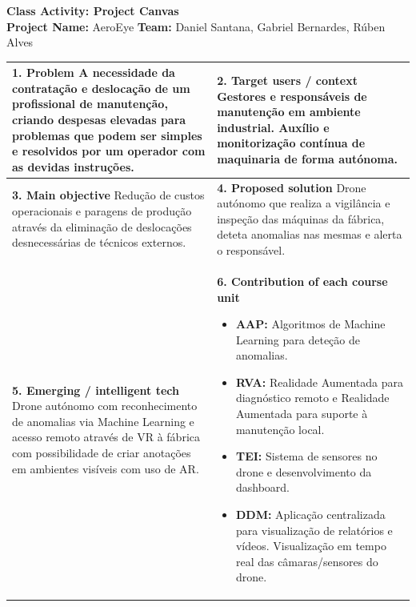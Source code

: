 \documentclass[11pt, a4paper]{article}
\begin{document}
\thispagestyle{empty} 

\begin{center}
    \textcolor{brandblue}{\LARGE \textbf{Class Activity: Project Canvas}} \\[0.15cm]
    \normalsize 
    \textbf{Project Name:} AeroEye \hspace{1cm} 
    \textbf{Team:} Daniel Santana, Gabriel Bernardes, Rúben Alves
\end{center}
\vspace{0.2cm}

\renewcommand{\arraystretch}{1.2}
\setlength{\tabcolsep}{15pt}

\noindent
\begin{tabularx}{\textwidth}{>{\raggedright\arraybackslash}X | >{\raggedright\arraybackslash}X}
\toprule
\textcolor{brandblue}{\textbf{1. Problem}} \newline
A necessidade da contratação e deslocação de um profissional de manutenção, criando despesas elevadas para problemas que podem ser simples e resolvidos por um operador com as devidas instruções.
& 
\textcolor{brandblue}{\textbf{2. Target users / context}} \newline
Gestores e responsáveis de manutenção em ambiente industrial. Auxílio e monitorização contínua de maquinaria de forma autónoma. \\

\midrule
\textcolor{brandblue}{\textbf{3. Main objective}} \newline
Redução de custos operacionais e paragens de produção através da eliminação de deslocações desnecessárias de técnicos externos.
&
\textcolor{brandblue}{\textbf{4. Proposed solution}} \newline
Drone autónomo que realiza a vigilância e inspeção das máquinas da fábrica, deteta anomalias nas mesmas e alerta o responsável. \\

\midrule
\textcolor{brandblue}{\textbf{5. Emerging / intelligent tech}} \newline
Drone autónomo com reconhecimento de anomalias via Machine Learning e acesso remoto através de VR à fábrica com possibilidade de criar anotações em ambientes visíveis com uso de AR.
& 
\textcolor{brandblue}{\textbf{6. Contribution of each course unit}} 
\begin{itemize}
    \item \textbf{AAP:} Algoritmos de Machine Learning para deteção de anomalias.
    \item \textbf{RVA:} Realidade Aumentada para diagnóstico remoto e Realidade Aumentada para suporte à manutenção local.
    \item \textbf{TEI:} Sistema de sensores no drone e desenvolvimento da dashboard.
    \item \textbf{DDM:} Aplicação centralizada para visualização de relatórios e vídeos. Visualização em tempo real das câmaras/sensores do drone.
\end{itemize} \\[2.5cm]


\end{tabularx}
\end{document}
